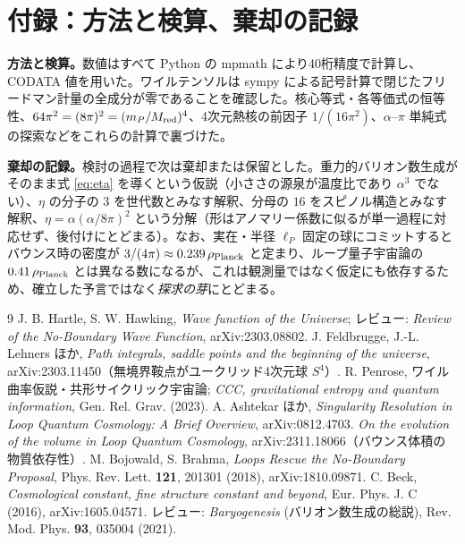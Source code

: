 \documentclass[11pt,a4paper]{article}
\newcommand{\eP}{\ell_P}
\begin{document}
\section*{付録：方法と検算、棄却の記録}
\textbf{方法と検算。}数値はすべて Python の mpmath により40桁精度で計算し、CODATA 値を用いた。ワイルテンソルは sympy による記号計算で閉じたフリードマン計量の全成分が零であることを確認した。核心等式・各等価式の恒等性、$64\pi^2=(8\pi)^2=(m_P/M_{\rm red})^4$、4次元熱核の前因子 $1/(16\pi^2)$、$\alpha$--$\pi$ 単純式の探索などをこれらの計算で裏づけた。

\textbf{棄却の記録。}検討の過程で次は棄却または保留とした。重力的バリオン数生成がそのまま式 \eqref{eq:eta} を導くという仮説（小ささの源泉が温度比であり $\alpha^3$ でない）、$\eta$ の分子の $3$ を世代数とみなす解釈、分母の $16$ をスピノル構造とみなす解釈、$\eta=\alpha(\alpha/8\pi)^2$ という分解（形はアノマリー係数に似るが単一過程に対応せず、後付けにとどまる）。なお、実在・半径 $\eP$ 固定の球にコミットするとバウンス時の密度が $3/(4\pi)\approx0.239\,\rho_{\rm Planck}$ と定まり、ループ量子宇宙論の $0.41\,\rho_{\rm Planck}$ とは異なる数になるが、これは観測量ではなく仮定にも依存するため、確立した予言ではなく\emph{探求の芽}にとどまる。

\begin{thebibliography}{9}
\small
{} J. B. Hartle, S. W. Hawking, \textit{Wave function of the Universe}; レビュー: \textit{Review of the No-Boundary Wave Function}, arXiv:2303.08802.
 J. Feldbrugge, J.-L. Lehners ほか, \textit{Path integrals, saddle points and the beginning of the universe}, arXiv:2303.11450（無境界鞍点がユークリッド4次元球 $S^4$）.
 R. Penrose, ワイル曲率仮説・共形サイクリック宇宙論; \textit{CCC, gravitational entropy and quantum information}, Gen. Rel. Grav. (2023).
 A. Ashtekar ほか, \textit{Singularity Resolution in Loop Quantum Cosmology: A Brief Overview}, arXiv:0812.4703.
 \textit{On the evolution of the volume in Loop Quantum Cosmology}, arXiv:2311.18066（バウンス体積の物質依存性）.
 M. Bojowald, S. Brahma, \textit{Loops Rescue the No-Boundary Proposal}, Phys. Rev. Lett. \textbf{121}, 201301 (2018), arXiv:1810.09871.
 C. Beck, \textit{Cosmological constant, fine structure constant and beyond}, Eur. Phys. J. C (2016), arXiv:1605.04571.
 レビュー: \textit{Baryogenesis} (バリオン数生成の総説), Rev. Mod. Phys. \textbf{93}, 035004 (2021).
\end{thebibliography}
\end{document}
